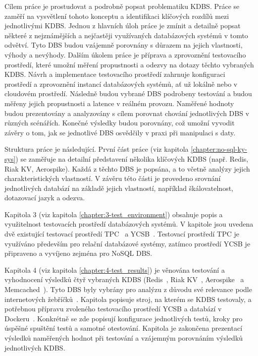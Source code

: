 \documentclass[czech,master,dept460,male,csharp,cpdeclaration]{diploma}
\begin{document}
	Cílem práce je prostudovat a podrobně popsat problematiku KDBS. Práce se zaměří na vysvětlení tohoto konceptu a identifikaci klíčových rozdílů mezi jednotlivými KDBS. Jednou z hlavních úloh práce je zmínit a detailně popsat některé z nejznámějších a nejčastěji využívaných databázových systémů v tomto odvětví. Tyto DBS budou vzájemně porovnány s důrazem na jejich vlastnosti, výhody a nevýhody. Dalším úkolem práce je příprava a zprovoznění testovacího prostředí, které umožní měření propustnosti a odezvy na dotazy těchto vybraných KDBS. Návrh a implementace testovacího prostředí zahrnuje konfiguraci prostředí a zprovoznění instancí databázových systémů, ať už lokálně nebo v cloudovém prostředí. Následně budou vybrané DBS podrobeny testování a budou měřeny jejich propustnosti a latence v reálném provozu. Naměřené hodnoty budou prezentovány a analyzovány s cílem porovnat chování jednotlivých DBS v různých scénářích. Konečné výsledky budou porovnány, což umožní vyvodit závěry o tom, jak se jednotlivé DBS osvědčily v praxi při manipulaci s daty.
	
	Struktura práce je následující. První část práce (viz kapitola \ref{chapter:no-sql-ky-sys}) se zaměřuje na detailní představení několika klíčových KDBS (např. Redis, Riak KV, Aerospike). Každá z těchto DBS je popsána, a to včetně analýzy jejich charakteristických vlastností. V závěru této části je provedeno srovnání jednotlivých databází na základě jejich vlastností, například škálovatelnost, dotazovací jazyk a odezva.
	
	Kapitola 3 (viz kapitola \ref{chapter:3-test_environment}) obsahuje popis a využitelnost testovacích prostředí databázových systémů. V kapitole jsou uvedena dvě existující testovací prostředí TPC~\cite{tpc} a YCSB~\cite{ycsb}. Testovací prostředí TPC je využíváno především pro relační databázové systémy, zatímco prostředí YCSB je připraveno a vyvíjeno zejména pro NoSQL DBS.
	
	Kapitola 4 (viz kapitola \ref{chapter:4-test_results}) je věnována testování a vyhodnocení výsledků čtyř vybraných KDBS (Redis~\cite{redis}, Riak KV~\cite{riak}, Aerospike~\cite{aerospike} a Memcached~\cite{memcached}). Tyto DBS byly vybrány pro analýzu z důvodu své relevance podle internetových žebříčků~\cite{db-engineers-ranking, predictiveanalyticstoday}. Kapitola popisuje stroj, na kterém se KDBS testovaly, a potřebnou přípravu zvoleného testovacího prostředí YCSB a databází v Dockeru~\cite{docker}. Konkrétně se zde popisují konfigurace jednotlivých testů, kroky pro úspěšné spuštění testů a samotné otestování. Kapitola je zakončena prezentací výsledků naměřených hodnot při testování a vzájemným porovnáním výsledků jednotlivých KDBS. 
	
\end{document}
